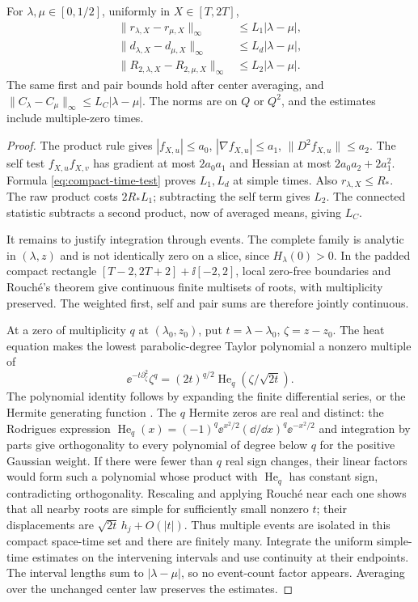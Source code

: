 \begin{theorem}\label{thm:time-modulus}
For $\lambda,\mu\in[0,1/2]$, uniformly in $X\in[T,2T]$,
\[
 \begin{aligned}
 \|r_{\lambda,X}-r_{\mu,X}\|_\infty&\le L_1|\lambda-\mu|,\\
 \|d_{\lambda,X}-d_{\mu,X}\|_\infty&\le L_d|\lambda-\mu|,\\
 \|R_{2,\lambda,X}-R_{2,\mu,X}\|_\infty&\le L_2|\lambda-\mu|.
 \end{aligned}
\]
The same first and pair bounds hold after center averaging, and
$\|C_\lambda-C_\mu\|_\infty\le L_C|\lambda-\mu|$.
The norms are on $Q$ or $Q^2$, and the estimates include multiple-zero times.
\end{theorem}
\begin{proof}
The product rule gives $|f_{X,u}|\le a_0$,
$|\nabla f_{X,u}|\le a_1$, $\|D^2f_{X,u}\|\le a_2$.
The self test $f_{X,u}f_{X,v}$ has gradient at most $2a_0a_1$ and
Hessian at most $2a_0a_2+2a_1^2$. Formula
\eqref{eq:compact-time-test} proves $L_1,L_d$ at simple times.
Also $r_{\lambda,X}\le R_*$. The raw product costs $2R_*L_1$;
subtracting the self term gives $L_2$. The connected statistic subtracts
a second product, now of averaged means, giving $L_C$.

It remains to justify integration through events. The complete family
is analytic in $(\lambda,z)$ and is not identically zero on a slice,
since $H_\lambda(0)>0$. In the padded compact rectangle
$[T-2,2T+2]+\ii[-2,2]$, local zero-free boundaries and Rouch\'e's theorem
give continuous finite multisets of roots, with multiplicity preserved.
The weighted first, self and pair sums are therefore jointly continuous.

At a zero of multiplicity $q$ at $(\lambda_0,z_0)$, put
$t=\lambda-\lambda_0$, $\zeta=z-z_0$. The heat equation makes the
lowest parabolic-degree Taylor polynomial a nonzero multiple of
\[
 \ee^{-t\partial_\zeta^2}\zeta^q
  =(2t)^{q/2}\operatorname{He}_q(\zeta/\sqrt{2t}).
\]
The polynomial identity follows by expanding the finite differential
series, or the Hermite generating function \cite{DLMFHermiteOC}.
The $q$ Hermite zeros are real and distinct: the Rodrigues expression
$\operatorname{He}_q(x)=(-1)^q\ee^{x^2/2}(\dd/\dd x)^q\ee^{-x^2/2}$
and integration by parts give orthogonality to every polynomial of
degree below $q$ for the positive Gaussian weight. If there were fewer
than $q$ real sign changes, their linear factors would form such a
polynomial whose product with $\operatorname{He}_q$ has constant sign,
contradicting orthogonality. Rescaling and applying Rouch\'e
near each one shows that all nearby roots are simple for sufficiently
small nonzero $t$; their displacements are
$\sqrt{2t}\,h_j+O(|t|)$. Thus multiple events are isolated in this
compact space-time set and there are finitely many. Integrate the
uniform simple-time estimates on the intervening intervals and use
continuity at their endpoints. The interval lengths sum to
$|\lambda-\mu|$, so no event-count factor appears. Averaging over
the unchanged center law preserves the estimates.
\end{proof}

